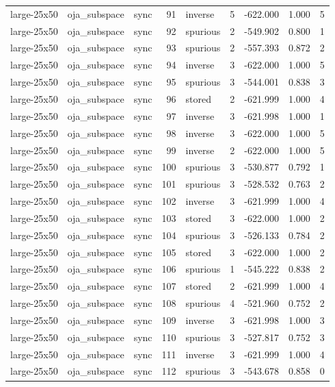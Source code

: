 \begin{tabular}{lllrlrrrr}
large-25x50 & oja\_subspace & sync & 91 & inverse & 5 & -622.000 & 1.000 & 5 \\
large-25x50 & oja\_subspace & sync & 92 & spurious & 2 & -549.902 & 0.800 & 1 \\
large-25x50 & oja\_subspace & sync & 93 & spurious & 2 & -557.393 & 0.872 & 2 \\
large-25x50 & oja\_subspace & sync & 94 & inverse & 3 & -622.000 & 1.000 & 5 \\
large-25x50 & oja\_subspace & sync & 95 & spurious & 3 & -544.001 & 0.838 & 3 \\
large-25x50 & oja\_subspace & sync & 96 & stored & 2 & -621.999 & 1.000 & 4 \\
large-25x50 & oja\_subspace & sync & 97 & inverse & 3 & -621.998 & 1.000 & 1 \\
large-25x50 & oja\_subspace & sync & 98 & inverse & 3 & -622.000 & 1.000 & 5 \\
large-25x50 & oja\_subspace & sync & 99 & inverse & 2 & -622.000 & 1.000 & 5 \\
large-25x50 & oja\_subspace & sync & 100 & spurious & 3 & -530.877 & 0.792 & 1 \\
large-25x50 & oja\_subspace & sync & 101 & spurious & 3 & -528.532 & 0.763 & 2 \\
large-25x50 & oja\_subspace & sync & 102 & inverse & 3 & -621.999 & 1.000 & 4 \\
large-25x50 & oja\_subspace & sync & 103 & stored & 3 & -622.000 & 1.000 & 2 \\
large-25x50 & oja\_subspace & sync & 104 & spurious & 3 & -526.133 & 0.784 & 2 \\
large-25x50 & oja\_subspace & sync & 105 & stored & 3 & -622.000 & 1.000 & 2 \\
large-25x50 & oja\_subspace & sync & 106 & spurious & 1 & -545.222 & 0.838 & 2 \\
large-25x50 & oja\_subspace & sync & 107 & stored & 2 & -621.999 & 1.000 & 4 \\
large-25x50 & oja\_subspace & sync & 108 & spurious & 4 & -521.960 & 0.752 & 2 \\
large-25x50 & oja\_subspace & sync & 109 & inverse & 3 & -621.998 & 1.000 & 3 \\
large-25x50 & oja\_subspace & sync & 110 & spurious & 3 & -527.817 & 0.752 & 3 \\
large-25x50 & oja\_subspace & sync & 111 & inverse & 3 & -621.999 & 1.000 & 4 \\
large-25x50 & oja\_subspace & sync & 112 & spurious & 3 & -543.678 & 0.858 & 0 \\

\end{tabular}
